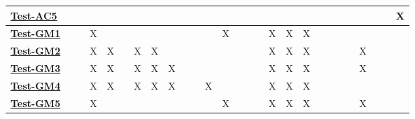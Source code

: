 \documentclass[12pt, titlepage]{article}
\begin{document}
\begin{landscape}
\begin{table}[H]
\begin{adjustwidth}{-0.0in}{-1in}
{\begin{tabular}{l|l|l|l|l|l|l|l|l|l|l|l|l|l|l|l|l|l|l|l|l|l|l|l|l|l|l|}
\multicolumn{1}{|l|}{\hyperref[Test-AC5]{\textbf{Test-AC5}}}  &              &              &              &              &              &              &              &              &              &               &               &               &               &               &               &               &               &               &               &               &               &               &             &             &             & X           \\ \hline
\multicolumn{1}{|l|}{\hyperref[Test-GM1]{\textbf{Test-GM1}}}  &              &              & X            &              &              &              &              &              &              &               &               & X             &               &               &               & X             & X             & X             &               &               &               &               &             &             &             &             \\ \hline
\multicolumn{1}{|l|}{\hyperref[Test-GM2]{\textbf{Test-GM2}}}  &              &              & X            & X            &              & X            & X            &              &              &               &               &               &               &               &               & X             & X             & X             &               &               &               &               & X           &             &             &             \\ \hline
\multicolumn{1}{|l|}{\hyperref[Test-GM3]{\textbf{Test-GM3}}}  &              &              & X            & X            &              & X            & X            & X            &              &               &               &               &               &               &               & X             & X             & X             &               &               &               &               & X           &             &             &             \\ \hline
\multicolumn{1}{|l|}{\hyperref[Test-GM4]{\textbf{Test-GM4}}}  &              &              & X            & X            &              & X            & X            & X            &              &               & X             &               &               &               &               & X             & X             & X             &               &               &               &               &             &             &             &             \\ \hline
\multicolumn{1}{|l|}{\hyperref[Test-GM5]{\textbf{Test-GM5}}}  &              &              & X            &              &              &              &              &              &              &               &               & X             &               &               &               & X             & X             & X             &               &               &               &               & X           &             &             &             \\ \hline

\end{tabular}}
\end{adjustwidth}
\end{table}
\end{landscape}
\end{document}
